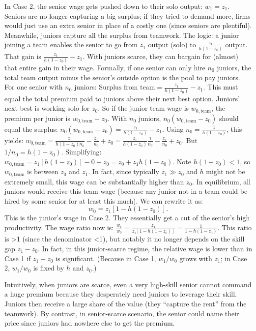 \documentclass[12pt]{article}
\begin{document}
In Case 2, the {senior wage gets pushed down to their solo
output}: \(w_1 = z_1.\) Seniors are no longer capturing a big surplus;
if they tried to demand more, firms would just use an extra senior in
place of a costly one (since seniors are plentiful). Meanwhile,
{juniors capture all the surplus from teamwork}. The logic: a
junior joining a team enables the senior to go from \(z_1\) output
(solo) to \(\frac{z_1}{h(1-z_0)}\) output. That gain is
\(\frac{z_1}{h(1-z_0)} - z_1\). With juniors scarce, they can bargain
for (almost) that entire gain in their wage. Formally, if one senior
can only hire \(n_0\) juniors, the total team output minus the
senior's outside option is the pool to pay juniors. For one senior
with \(n_0\) juniors:
\(\text{Surplus from team} = \frac{z_1}{h(1-z_0)} - z_1.\) This must
equal the total premium paid to juniors above their next best option.
Juniors' next best is working solo for \(z_0\). So if the junior team
wage is \(w_{0,\text{team}}\), the premium per junior is
\(w_{0,\text{team}} - z_0\). With \(n_0\) juniors,
\(n_0 (w_{0,\text{team}} - z_0)\) should equal the surplus:
\(n_0 (w_{0,\text{team}} - z_0) = \frac{z_1}{h(1-z_0)} - z_1.\) Using
\(n_0 = \frac{1}{h(1-z_0)}\), this yields:
\(w_{0,\text{team}} = \frac{z_1}{h(1-z_0) n_0} - \frac{z_1}{n_0} + z_0 = \frac{z_1}{h(1-z_0)} \frac{1}{n_0} - \frac{z_1}{n_0} + z_0.\)
But \(1/n_0 = h(1-z_0)\). Simplifying:
\(w_{0,\text{team}} = z_1 [h(1-z_0)] - 0 + z_0 = z_0 + z_1 h(1-z_0).\)
Note \(h(1-z_0) < 1\), so \(w_{0,\text{team}}\) is between \(z_0\) and
\(z_1\). In fact, since typically \(z_1 \gg z_0\) and \(h\) might not
be extremely small, this wage can be substantially higher than
\(z_0\). In equilibrium, all juniors would receive this team wage
(because any junior not in a team could be hired by some senior for at
least this much). We can rewrite it as: 
\begin{equation}
w_0 = z_1[1 - h
(1-z_0)]. \tag{6}
\end{equation}
This is the {junior's wage in Case 2}.
They essentially get a cut of the senior's high productivity. The
{wage ratio} now is:
\(\frac{w_1}{w_0} = \frac{z_1}{z_1[1 - h(1-z_0)]} = \frac{1}{1 - h(1-z_0)}.\)
This ratio is >1 (since the denominator <1), but
notably it no longer depends on the skill gap \(z_1 - z_0\). In fact,
in this junior-scarce regime, the {relative wage is lower} than
in Case 1 if \(z_1 - z_0\) is significant. (Because in Case 1,
\(w_1/w_0\) grows with \(z_1\); in Case 2, \(w_1/w_0\) is fixed by
\(h\) and \(z_0\).)

Intuitively, when juniors are scarce, even a very high-skill senior
cannot command a huge premium because they desperately need juniors to
leverage their skill. Juniors then receive a large share of the value
(they ``capture the rent'' from the teamwork). By contrast, in
senior-scarce scenario, the senior could name their price since
juniors had nowhere else to get the premium.
\end{document}
